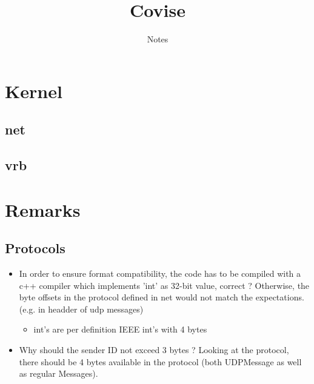 \documentclass[12pt,pdftex,a4paper]{scrbook}
\begin{document}
	\thispagestyle{empty}
	\title{Covise}
	\subtitle{Notes}
	\author{}
	\maketitle
	
	\newpage
	\tableofcontents

	\part{Kernel}
	
	\chapter{net}
	
	
	
	\chapter{vrb}

	\part{Remarks}

	\chapter{Protocols}

	\begin{itemize}
		\item In order to ensure format compatibility, the code has to be compiled with a c++ compiler which implements 'int' as 32-bit value, correct ? Otherwise, the byte offsets in the protocol defined in net would not match the expectations. (e.g. in headder of udp messages)
		\begin{itemize}
			\item int's are per definition IEEE int's with 4 bytes
		\end{itemize}
		\item Why should the sender ID not exceed 3 bytes ? Looking at the protocol, there should be 4 bytes available in the protocol (both UDPMessage as well as regular Messages). 
	\end{itemize}
\end{document}
